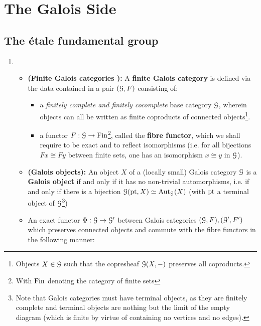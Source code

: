 \section{The Galois Side}
    \subsection{The \'etale fundamental group}
        \begin{definition} \label{def: finite_galois_categories}
            \noindent
            \begin{enumerate}
                \item 
                    \begin{itemize}
                        \item \textbf{(Finite Galois categories \cite[\href{https://stacks.math.columbia.edu/tag/0BMY}{Tag 0BMY}]{stacks}):} A \textbf{finite Galois category} is defined via the data contained in a pair $(\mathcal{G}, F)$ consisting of:
                        \begin{itemize}
                            \item a \textit{finitely complete and finitely cocomplete} base category $\mathcal{G}$, wherein objects can all be written as finite coproducts of connected objects\footnote{Objects $X \in \mathcal{G}$ such that the copresheaf $\mathcal{G}(X, -)$ preserves all coproducts.}.
                            \item a functor $F: \mathcal{G} \to \mathrm{Fin}$\footnote{With $\mathrm{Fin}$ denoting the category of finite sets}, called the \textbf{fibre functor}, which we shall require to be exact and to reflect isomorphisms (i.e. for all bijections $Fx \cong Fy$ between finite sets, one has an isomorphism $x \cong y$ in $\mathcal{G}$).
                        \end{itemize}
                        \item \textbf{(Galois objects):} An object $X$ of a (locally small) Galois category $\mathcal{G}$ is a \textbf{Galois object} if and only if it has no non-trivial automorphisms, i.e. if and only if there is a bijection $\mathcal{G}(\mathrm{pt}, X) \simeq \mathrm{Aut}_{\mathcal{G}}(X)$ (with $\mathrm{pt}$ a terminal object of $\mathcal{G}$\footnote{Note that Galois categories must have terminal objects, as they are finitely complete and terminal objects are nothing but the limit of the empty diagram (which is finite by virtue of containing no vertices and no edges).})
                        \item An exact functor $\Phi: \mathcal{G} \to \mathcal{G}'$ between Galois categories $(\mathcal{G}, F), (\mathcal{G}', F')$ which preserves connected objects and commute with the fibre functors in the following manner:

\end{itemize}
\end{enumerate}
\end{definition}
